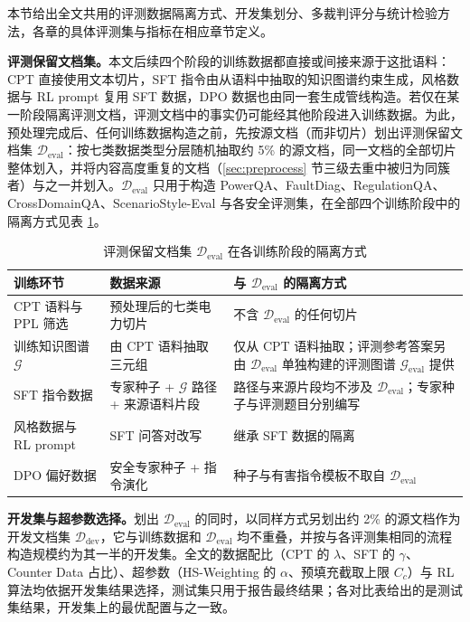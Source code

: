 \documentclass[fontset=fandol,type=master,campus=shenzhen,etitleauto=true]{hithesisbook}
\begin{document}
本节给出全文共用的评测数据隔离方式、开发集划分、多裁判评分与统计检验方法，各章的具体评测集与指标在相应章节定义。

\textbf{评测保留文档集。}本文后续四个阶段的训练数据都直接或间接来源于这批语料：CPT 直接使用文本切片，SFT 指令由从语料中抽取的知识图谱约束生成，风格数据与 RL prompt 复用 SFT 数据，DPO 数据也由同一套生成管线构造。若仅在某一阶段隔离评测文档，评测文档中的事实仍可能经其他阶段进入训练数据。为此，预处理完成后、任何训练数据构造之前，先按源文档（而非切片）划出评测保留文档集 $\mathcal{D}_{\text{eval}}$：按七类数据类型分层随机抽取约 5\% 的源文档，同一文档的全部切片整体划入，并将内容高度重复的文档（\ref{sec:preprocess} 节三级去重中被归为同簇者）与之一并划入。$\mathcal{D}_{\text{eval}}$ 只用于构造 PowerQA、FaultDiag、RegulationQA、CrossDomainQA、ScenarioStyle-Eval 与各安全评测集，在全部四个训练阶段中的隔离方式见表 \ref{tab:eval-isolation}。

\begin{table}[htbp]
\centering
\caption{评测保留文档集 $\mathcal{D}_{\text{eval}}$ 在各训练阶段的隔离方式}
\label{tab:eval-isolation}
\small
\renewcommand{\arraystretch}{1.15}
\begin{tabular}{p{3.0cm}p{4.6cm}p{5.6cm}}
\toprule
\textbf{训练环节} & \textbf{数据来源} & \textbf{与 $\mathcal{D}_{\text{eval}}$ 的隔离方式} \\
\midrule
CPT 语料与 PPL 筛选 & 预处理后的七类电力切片 & 不含 $\mathcal{D}_{\text{eval}}$ 的任何切片 \\
训练知识图谱 $\mathcal{G}$ & 由 CPT 语料抽取三元组 & 仅从 CPT 语料抽取；评测参考答案另由 $\mathcal{D}_{\text{eval}}$ 单独构建的评测图谱 $\mathcal{G}_{\text{eval}}$ 提供 \\
SFT 指令数据 & 专家种子 + $\mathcal{G}$ 路径 + 来源语料片段 & 路径与来源片段均不涉及 $\mathcal{D}_{\text{eval}}$；专家种子与评测题目分别编写 \\
风格数据与 RL prompt & SFT 问答对改写 & 继承 SFT 数据的隔离 \\
DPO 偏好数据 & 安全专家种子 + 指令演化 & 种子与有害指令模板不取自 $\mathcal{D}_{\text{eval}}$ \\
\bottomrule
\end{tabular}
\end{table}

\textbf{开发集与超参数选择。}划出 $\mathcal{D}_{\text{eval}}$ 的同时，以同样方式另划出约 2\% 的源文档作为开发文档集 $\mathcal{D}_{\text{dev}}$，它与训练数据和 $\mathcal{D}_{\text{eval}}$ 均不重叠，并按与各评测集相同的流程构造规模约为其一半的开发集。全文的数据配比（CPT 的 $\lambda$、SFT 的 $\gamma$、Counter Data 占比）、超参数（HS-Weighting 的 $\alpha$、预填充截取上限 $C_c$）与 RL 算法均依据开发集结果选择，测试集只用于报告最终结果；各对比表给出的是测试集结果，开发集上的最优配置与之一致。
\end{document}
